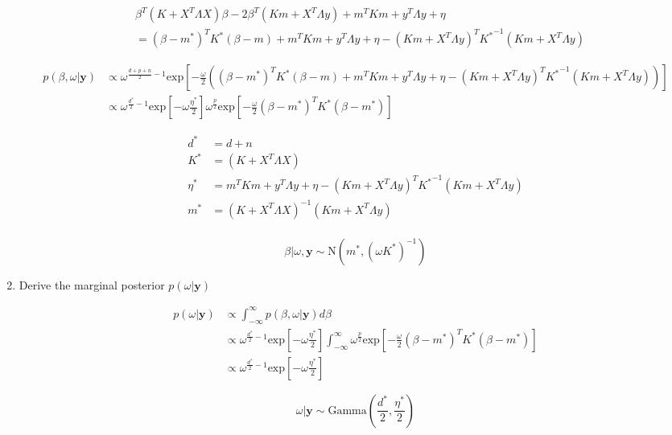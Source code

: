 \documentclass[10pt]{article}
\newcommand{\by}{\mathbf{y}}
\begin{document}
\begin{enumerate}[label=(\Alph*)]
      \begin{align*}
        &\beta^T ( K+ X^T \Lambda X) \beta - 2 \beta^T (K m + X^T \Lambda y) + m^TKm + y^T\Lambda y + \eta \\
        &= (\beta - m^*)^T K^* (\beta - m) + m^T K m + y^T \Lambda y + \eta - (K m + X^T \Lambda y)^T  {K^*}^{-1} (K m + X^T \Lambda y)
      \end{align*}

      \begin{align*}
        p(\beta, \omega | \by) &\propto \omega^{\frac{d+p+n}{2}-1} \text{exp}\left [ -\frac{\omega}{2} \left ( (\beta - m^*)^T K^* (\beta - m) + m^T K m + y^T \Lambda y + \eta - (K m + X^T \Lambda y)^T  {K^*}^{-1} (K m + X^T \Lambda y)\right)\right] \\
        &\propto \omega^{\frac{d^*}{2} - 1} \text{exp}\left[-\omega \frac{\eta^*}{2} \right]\omega^{\frac{p}{2}} \text{exp} \left[ -\frac{\omega}{2} (\beta - m^*)^T K^* (\beta - m^*) \right]
      \end{align*}

      \begin{align*}
        d^* &= d+n \\
        K^* &= ( K+ X^T \Lambda X) \\
        \eta^* &= m^T K m + y^T \Lambda y + \eta - (K m + X^T \Lambda y)^T  {K^*}^{-1} (K m + X^T \Lambda y) \\
        m^* &= (K + X^T \Lambda X)^{-1}(K m + X^T \Lambda y) \\
      \end{align*}

      $$\beta | \omega, \by \sim \text{N}\left( m^*, (\omega K^*)^{-1}\right)$$

      \item Derive the marginal posterior $p(\omega | \by)$

      \begin{align*}
        p(\omega | \by) & \propto \int_{-\infty}^{\infty} p(\beta, \omega | \by) d \beta \\
        & \propto \omega^{\frac{d^*}{2}-1} \text{exp}\left[-\omega \frac{\eta^*}{2} \right] \int_{-\infty}^{\infty} \omega^{\frac{p}{2}} \text{exp} \left[ -\frac{\omega}{2} (\beta - m^*)^T K^* (\beta - m^*) \right] \\
        & \propto \omega^{\frac{d^*}{2}-1} \text{exp}\left[-\omega \frac{\eta^*}{2} \right]
      \end{align*}

      $$\omega | \by \sim \text{Gamma}\left ( \frac{d^*}{2}, \frac{\eta^*}{2}\right)$$


\end{enumerate}
\end{document}
